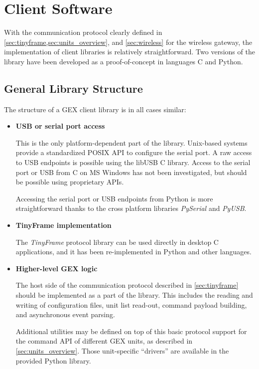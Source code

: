 \chapter{Client Software} \label{sec:clientsw}

With the communication protocol clearly defined in \cref{sec:tinyframe,sec:units_overview}, and \cref{sec:wireless} for the wireless gateway, the implementation of client libraries is relatively straightforward. Two versions of the library have been developed as a proof-of-concept in languages C and Python.

\section{General Library Structure}

The structure of a GEX client library is in all cases similar:

\begin{itemize}
    \item \textbf{USB or serial port access}

        This is the only platform-dependent part of the library. Unix-based systems provide a standardized POSIX API to configure the serial port. A raw access to \gls{USB} endpoints is possible using the libUSB C library. Access to the serial port or \gls{USB} from C on MS Windows has not been investigated, but should be possible using proprietary APIs.

        Accessing the serial port or \gls{USB} endpoints from Python is more straightforward thanks to the cross platform libraries \textit{PySerial} and \textit{PyUSB}.

    \item \textbf{TinyFrame implementation}

        The \textit{TinyFrame} protocol library can be used directly in desktop C applications, and it has been re-implemented in Python and other languages.

    \item \textbf{Higher-level GEX logic}

        The host side of the communication protocol described in \cref{sec:tinyframe} should be implemented as a part of the library. This includes the reading and writing of configuration files, unit list read-out, command payload building, and asynchronous event parsing.

        Additional utilities may be defined on top of this basic protocol support for the command API of different GEX units, as described in \cref{sec:units_overview}. Those unit-specific ``drivers'' are available in the provided Python library.
\end{itemize}

